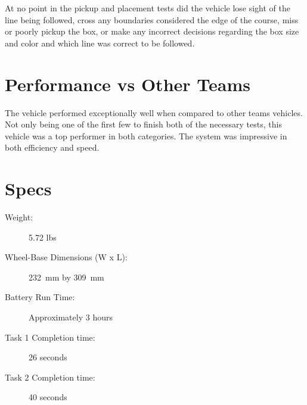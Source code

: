 \documentclass[11pt]{report}
\begin{document}
At no point in the pickup and placement tests did the vehicle lose sight of the line being followed, cross any boundaries considered the edge of the course, miss or poorly pickup the box, or make any incorrect decisions regarding the box size and color and which line was correct to be followed. 
\section{Performance vs Other Teams}
The vehicle performed exceptionally well when compared to other teams vehicles. Not only being one of the first few to finish both of the necessary tests, this vehicle was a top performer in both categories. The system was impressive in both efficiency and speed. 

\section{Specs}
\begin{description}
    \item[Weight:] 5.72 lbs 
    \item[Wheel-Base Dimensions (W x L):] \SI{232}{mm} by \SI{309}{mm}
    \item[Battery Run Time:] Approximately 3 hours
    \item[Task 1 Completion time:] 26 seconds
    \item[Task 2 Completion time:] 40 seconds
\end{description}
\end{document}
